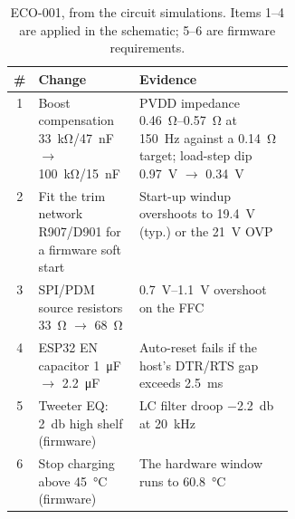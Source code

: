 \begin{table}[htbp]
\centering\small
\caption{ECO-001, from the circuit simulations. Items 1--4 are applied in the schematic; 5--6 are firmware requirements.}
\label{tab:eco}
\begin{tabularx}{\linewidth}{@{}c >{\raggedright\arraybackslash}p{0.36\linewidth} >{\raggedright\arraybackslash}X@{}}
\toprule
\# & Change & Evidence \\
\midrule
1 & Boost compensation \qty{33}{\kilo\ohm}/\qty{47}{\nano\farad} $\to$ \qty{100}{\kilo\ohm}/\qty{15}{\nano\farad} & PVDD impedance \qtyrange{0.46}{0.57}{\ohm} at \qty{150}{\hertz} against a \qty{0.14}{\ohm} target; load-step dip \qty{0.97}{\volt} $\to$ \qty{0.34}{\volt} \\
2 & Fit the trim network R907/D901 for a firmware soft start & Start-up windup overshoots to \qty{19.4}{\volt} (typ.) or the \qty{21}{\volt} OVP \\
3 & SPI/PDM source resistors \qty{33}{\ohm} $\to$ \qty{68}{\ohm} & \qtyrange{0.7}{1.1}{\volt} overshoot on the FFC \\
4 & ESP32 EN capacitor \qty{1}{\micro\farad} $\to$ \qty{2.2}{\micro\farad} & Auto-reset fails if the host's DTR/RTS gap exceeds \qty{2.5}{\milli\second} \\
5 & Tweeter EQ: \qty{+2}{\decibel} high shelf (firmware) & LC filter droop \qty{-2.2}{\decibel} at \qty{20}{\kilo\hertz} \\
6 & Stop charging above \qty{45}{\degreeCelsius} (firmware) & The hardware window runs to \qty{60.8}{\degreeCelsius} \\
\bottomrule
\end{tabularx}
\end{table}
